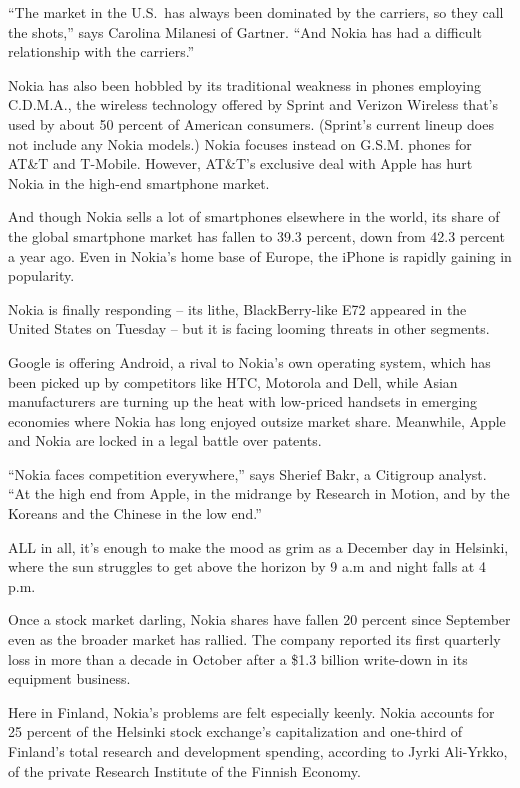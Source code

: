 ﻿\documentclass[12pt]{article}
\begin{document}
``The market in the U.S.~has always been dominated by the carriers, so they call the shots,'' says
Carolina Milanesi of Gartner. ``And Nokia has had a difficult relationship with the carriers.''

Nokia has also been hobbled by its traditional weakness in phones employing C.D.M.A., the wireless
technology offered by Sprint and Verizon Wireless that's used by about 50 percent of American
consumers. (Sprint's current lineup does not include any Nokia models.) Nokia focuses instead on
G.S.M. phones for AT\&T and T-Mobile. However, AT\&T's exclusive deal with Apple has hurt Nokia in
the high-end smartphone market.

And though Nokia sells a lot of smartphones elsewhere in the world, its share of the global
smartphone market has fallen to 39.3 percent, down from 42.3 percent a year ago. Even in Nokia's
home base of Europe, the iPhone is rapidly gaining in popularity.

Nokia is finally responding -- its lithe, BlackBerry-like E72 appeared in the United States on
Tuesday -- but it is facing looming threats in other segments.

Google is offering Android, a rival to Nokia's own operating system, which has been picked up by
competitors like HTC, Motorola and Dell, while Asian manufacturers are turning up the heat with
low-priced handsets in emerging economies where Nokia has long enjoyed outsize market share.
Meanwhile, Apple and Nokia are locked in a legal battle over patents.

``Nokia faces competition everywhere,'' says Sherief Bakr, a Citigroup analyst. ``At the high end
from Apple, in the midrange by Research in Motion, and by the Koreans and the Chinese in the low
end.''

ALL in all, it's enough to make the mood as grim as a December day in Helsinki, where the sun
struggles to get above the horizon by 9 a.m and night falls at 4 p.m.

Once a stock market darling, Nokia shares have fallen 20 percent since September even as the broader
market has rallied. The company reported its first quarterly loss in more than a decade in October
after a \$1.3 billion write-down in its equipment business.

Here in Finland, Nokia's problems are felt especially keenly. Nokia accounts for 25 percent of the
Helsinki stock exchange's capitalization and one-third of Finland's total research and development
spending, according to Jyrki Ali-Yrkko, of the private Research Institute of the Finnish Economy.
\end{document}
